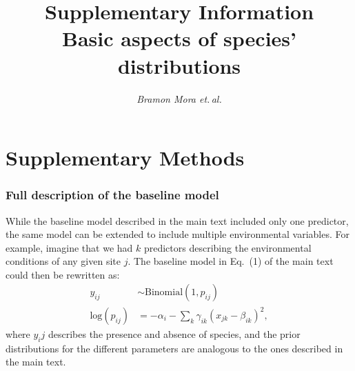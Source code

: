 \documentclass[11pt, a4paper]{article}
\title{\vspace{-1cm} \normalsize Supplementary Information\\\vspace{0.2cm}
\LARGE Basic aspects of species' distributions}
\author{\textit{Bramon Mora et.\,al.}}
\date{}
\begin{document}
\maketitle
\thispagestyle{empty}

\clearpage


\section*{Supplementary Methods}
\subsubsection*{Full description of the baseline model}
While the baseline model described in the main text included only one predictor, the same model can be extended to include multiple environmental variables. For example, imagine that we had $k$ predictors describing the environmental conditions of any given site $j$. The baseline model in Eq.~(1) of the main text could then be rewritten as:
\begin{equation}
\begin{split}
y_{ij} & \sim \text{Binomial}\left(1, p_{ij}\right) \\
\text{log}\left(p_{ij}\right) & = -\alpha_{i} - \sum_k \gamma_{ik} \left(x_{jk}-\beta_{ik}\right)^2,
\end{split}
\label{eq:baseline-binary}
\end{equation}
where $y_ij$ describes the presence and absence of species, and the prior distributions for the different parameters are analogous to the ones described in the main text.
\end{document}
